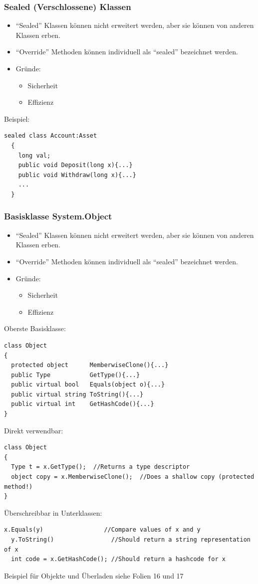 \subsubsection{Sealed (Verschlossene) Klassen}
\begin{itemize}
  \item "`Sealed"' Klassen können nicht erweitert werden, aber sie können von
  anderen Klassen erben. 
  \item "`Override"' Methoden können individuell als "`sealed"' bezeichnet
  werden.
  \item Gründe:
  \begin{itemize}
    \item Sicherheit
    \item Effizienz
  \end{itemize}
\end{itemize}
Beispiel: 
\begin{lstlisting}[style=Csharp]
  sealed class Account:Asset
  {
    long val; 
    public void Deposit(long x){...}
    public void Withdraw(long x){...}
    ...
  }
\end{lstlisting}

\subsubsection{Basisklasse System.Object}
\begin{itemize}
  \item "`Sealed"' Klassen können nicht erweitert werden, aber sie können von
  anderen Klassen erben. 
  \item "`Override"' Methoden können individuell als "`sealed"' bezeichnet
  werden.
  \item Gründe:
  \begin{itemize}
    \item Sicherheit
    \item Effizienz
  \end{itemize}
\end{itemize}
Oberste Basisklasse:
\begin{lstlisting}[style=Csharp]
class Object
{
  protected object      MemberwiseClone(){...}
  public Type           GetType(){...}
  public virtual bool   Equals(object o){...}
  public virtual string ToString(){...}
  public virtual int    GetHashCode(){...}
}
\end{lstlisting}
Direkt verwendbar: 
\begin{lstlisting}[style=Csharp]
class Object
{
  Type t = x.GetType();  //Returns a type descriptor
  object copy = x.MemberwiseClone();  //Does a shallow copy (protected method!)
}
\end{lstlisting}
Überschreibbar in Unterklassen: 
\begin{lstlisting}[style=Csharp]
  x.Equals(y)                 //Compare values of x and y
  y.ToString()                //Should return a string representation of x
  int code = x.GetHashCode(); //Should return a hashcode for x
\end{lstlisting}

Beispiel für Objekte und Überladen siehe Folien 16 und 17
